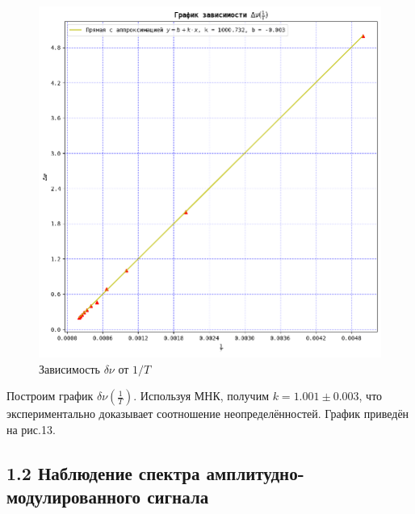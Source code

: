 \documentclass[a4paper,12pt]{article}
\theoremstyle{definition}
\begin{document}
\begin{enumerate}
\newpage

\begin{figure}[h]
    \centering
    \includegraphics[width=0.7\linewidth]{grafic2.png}
    \caption{Зависимость $\delta \nu$ от $1/T$}
    \label{grafic2}
\end{figure}
Построим график $\delta\nu\left(\frac{1}{T}\right)$. Используя МНК, получим $k=1.001\pm0.003$, что экспериментально доказывает соотношение неопределённостей. График приведён на рис.13.
\end{enumerate}


\newpage

\subsection*{1.2 Наблюдение спектра амплитудно-модулированного сигнала}
\end{document}
